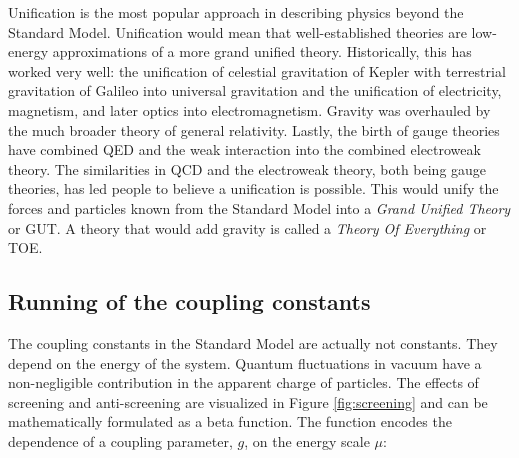 Unification is the most popular approach in describing physics beyond the Standard Model. Unification would mean that well-established theories are low-energy approximations of a more grand unified theory. Historically, this has worked very well: the unification of celestial gravitation of Kepler with terrestrial gravitation of Galileo into universal gravitation and the unification of electricity, magnetism, and later optics into electromagnetism. Gravity was overhauled by the much broader theory of general relativity. Lastly, the birth of gauge theories have combined QED and the weak interaction into the combined electroweak theory. The similarities in QCD and the electroweak theory, both being gauge theories, has led people to believe a unification is possible. This would unify the forces and particles known from the Standard Model into a \textit{Grand Unified Theory} or GUT. A theory that would add gravity is called a \textit{Theory Of Everything} or TOE.

\iffalse
\subsection{Running of the coupling constants}
\label{subsec:running}
The coupling constants in the Standard Model are actually not constants. They depend on the energy of the system. Quantum fluctuations in vacuum have a non-negligible contribution in the apparent charge of particles. The effects of screening and anti-screening are visualized in Figure \ref{fig:screening} and can be mathematically formulated as a beta function. The function encodes the dependence of a coupling parameter, $g$, on the energy scale $\mu$:


